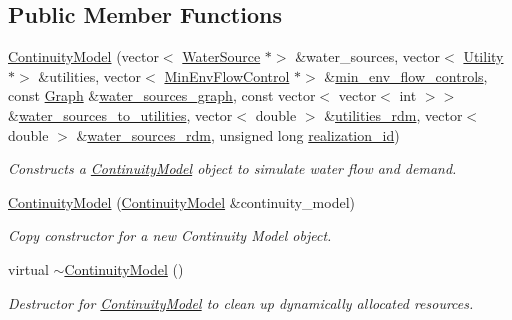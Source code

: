 \subsection*{Public Member Functions}
\begin{DoxyCompactItemize}
\item 
\mbox{\hyperlink{classContinuityModel_acadf595deb924bc08c9b702adf223365}{Continuity\+Model}} (vector$<$ \mbox{\hyperlink{classWaterSource}{Water\+Source}} $\ast$$>$ \&water\+\_\+sources, vector$<$ \mbox{\hyperlink{classUtility}{Utility}} $\ast$$>$ \&utilities, vector$<$ \mbox{\hyperlink{classMinEnvFlowControl}{Min\+Env\+Flow\+Control}} $\ast$$>$ \&\mbox{\hyperlink{classContinuityModel_afc991e5c0d144020e49a97751a04b302}{min\+\_\+env\+\_\+flow\+\_\+controls}}, const \mbox{\hyperlink{classGraph}{Graph}} \&\mbox{\hyperlink{classContinuityModel_a563401588c6fa622f03393909a3522db}{water\+\_\+sources\+\_\+graph}}, const vector$<$ vector$<$ int $>$$>$ \&\mbox{\hyperlink{classContinuityModel_ae8516bcbbf52650190277fc8b06c1843}{water\+\_\+sources\+\_\+to\+\_\+utilities}}, vector$<$ double $>$ \&\mbox{\hyperlink{classContinuityModel_aa4a00b76da6295d2faa11e3dcaea1896}{utilities\+\_\+rdm}}, vector$<$ double $>$ \&\mbox{\hyperlink{classContinuityModel_ab7b8fa93a6f56b328e425e1ead6cfefa}{water\+\_\+sources\+\_\+rdm}}, unsigned long \mbox{\hyperlink{classContinuityModel_a7b6c99bf256f6c6b633ebb78282f43c7}{realization\+\_\+id}})
\begin{DoxyCompactList}\small\item\em Constructs a \mbox{\hyperlink{classContinuityModel}{Continuity\+Model}} object to simulate water flow and demand. \end{DoxyCompactList}\item 
\mbox{\hyperlink{classContinuityModel_a7f46eb1f937b813226ca7fee96e5fd5c}{Continuity\+Model}} (\mbox{\hyperlink{classContinuityModel}{Continuity\+Model}} \&continuity\+\_\+model)
\begin{DoxyCompactList}\small\item\em Copy constructor for a new Continuity Model object. \end{DoxyCompactList}\item 
virtual \mbox{\hyperlink{classContinuityModel_ae901ce342cd6e49c17994e4910873187}{$\sim$\+Continuity\+Model}} ()
\begin{DoxyCompactList}\small\item\em Destructor for \mbox{\hyperlink{classContinuityModel}{Continuity\+Model}} to clean up dynamically allocated resources. \end{DoxyCompactList}\item 

\end{DoxyCompactItemize}
